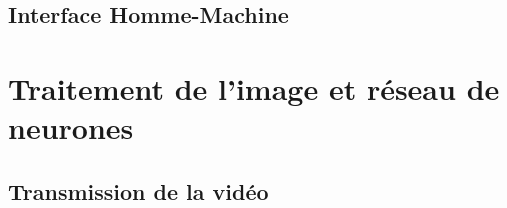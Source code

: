 		\subsection{Interface Homme-Machine}
		\label{sub:ihm}


	\section{Traitement de l'image et réseau de neurones}
	
		\subsection{Transmission de la vidéo}
		
